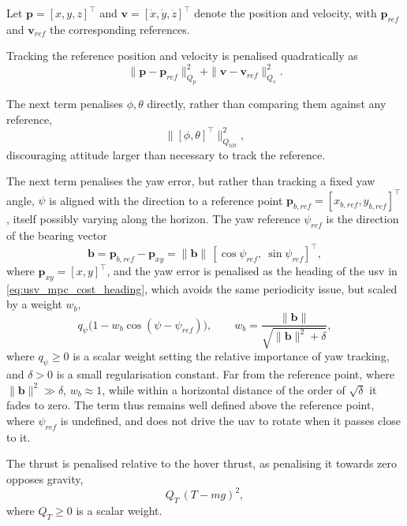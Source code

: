 Let $\mathbf{p} = [x,y,z]^\top$ and $\mathbf{v} = [\dot x,\dot y,\dot z]^\top$ denote the position and velocity, with $\mathbf{p}_{ref}$ and $\mathbf{v}_{ref}$ the corresponding references.

Tracking the reference position and velocity is penalised quadratically as
\begin{equation}
    \|\mathbf{p}-\mathbf{p}_{ref}\|^2_{Q_p} + \|\mathbf{v}-\mathbf{v}_{ref}\|^2_{Q_v}.
    \label{eq:uav_mpc_cost_track}
\end{equation}

The next term penalises $\phi,\theta$ directly, rather than comparing them against any reference,
\begin{equation}
    \big\|[\phi,\theta]^\top\big\|^2_{Q_{tilt}},
    \label{eq:uav_mpc_cost_tilt}
\end{equation}
discouraging attitude larger than necessary to track the reference.

The next term penalises the yaw error, but rather than tracking a fixed yaw angle, $\psi$ is aligned with the direction to a reference point $\mathbf{p}_{b,ref} = [x_{b,ref},y_{b,ref}]^\top$, itself possibly varying along the horizon. The yaw reference $\psi_{ref}$ is the direction of the bearing vector
\begin{equation}
    \mathbf{b} = \mathbf{p}_{b,ref} - \mathbf{p}_{xy} = \|\mathbf{b}\|\,[\cos\psi_{ref},\ \sin\psi_{ref}]^\top,
    \label{eq:uav_mpc_yaw_direction}
\end{equation}
where $\mathbf{p}_{xy}=[x,y]^\top$, and the yaw error is penalised as the heading of the \gls{usv} in \eqref{eq:usv_mpc_cost_heading}, which avoids the same periodicity issue, but scaled by a weight $w_b$,
\begin{equation}
    q_\psi\big(1 - w_b\cos(\psi-\psi_{ref})\big), \qquad w_b = \frac{\|\mathbf{b}\|}{\sqrt{\|\mathbf{b}\|^2 + \delta}},
    \label{eq:uav_mpc_cost_yaw}
\end{equation}
where $q_\psi \ge 0$ is a scalar weight setting the relative importance of yaw tracking, and $\delta > 0$ is a small regularisation constant. Far from the reference point, where $\|\mathbf{b}\|^2 \gg \delta$, $w_b \approx 1$, while within a horizontal distance of the order of $\sqrt{\delta}$ it fades to zero. The term thus remains well defined above the reference point, where $\psi_{ref}$ is undefined, and does not drive the \gls{uav} to rotate when it passes close to it.

The thrust is penalised relative to the hover thrust, as penalising it towards zero opposes gravity,
\begin{equation}
    Q_T\,(T - mg)^2,
    \label{eq:uav_mpc_cost_thrust}
\end{equation}
where $Q_T \ge 0$ is a scalar weight.

